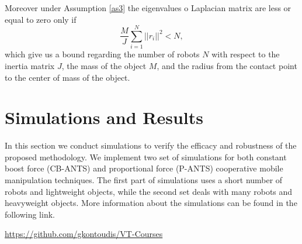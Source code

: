 \documentclass[letterpaper, 10 pt, conference]{ieeeconf}
\begin{document}
Moreover under Assumption \ref{as3} the eigenvalues o Laplacian matrix are less or equal to zero only if 
\begin{equation}\label{mpantsBound}
\frac{M}{J}\sum_{i=1}^N||r_i||^2<N,
\end{equation}
which give us a bound regarding the number of robots $N$ with respect to the inertia matrix $J$, the mass of the object $M$, and the radius from the contact point to the center of mass of the object.

\section{Simulations and Results}\label{sim}
In this section we conduct simulations to verify the efficacy and robustness of the proposed methodology. We implement two set of simulations for both constant boost force (CB-ANTS) and proportional force (P-ANTS) cooperative mobile manipulation techniques. The first part of simulations uses a short number of robots and lightweight objects, while the second set deals with many robots and heavyweight objects. More information about the simulations can be found in the following link.
\begin{center}
\url{https://github.com/gkontoudis/VT-Courses}
\end{center}
\end{document}
